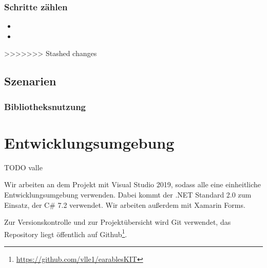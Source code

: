 \documentclass[a4paper,12pt]{article}
\begin{document}
  \subsubsection{Schritte zählen}
  \begin{itemize}
    \item[]
    \item[] 
  \end{itemize}
>>>>>>> Stashed changes
  \subsection{Szenarien}
    \subsubsection{Bibliotheksnutzung}


\section{Entwicklungsumgebung}
TODO valle

Wir arbeiten an dem Projekt mit Visual Studio 2019, sodass alle eine einheitliche Entwicklungsumgebung verwenden.
Dabei kommt der .NET Standard 2.0 zum Einsatz, der C\# 7.2 verwendet. Wir arbeiten außerdem mit Xamarin Forms.

Zur Versionskontrolle und zur Projektübersicht wird Git verwendet, das Repository liegt öffentlich auf Github\footnote{\url{https://github.com/vlle1/earablesKIT}}.
\clearpage

\printglossaries
\end{document}
